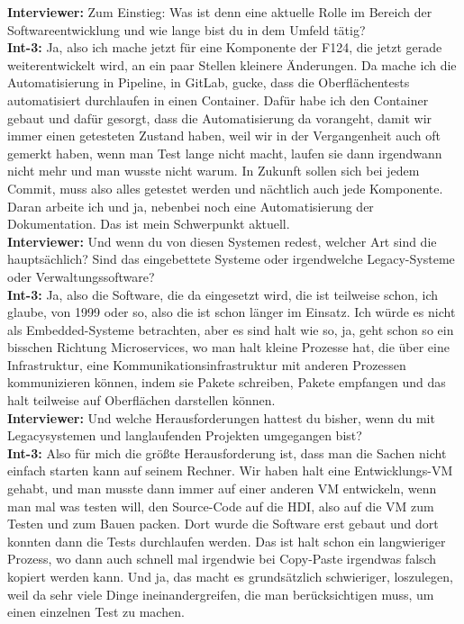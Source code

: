 \textbf{Interviewer:} Zum Einstieg: Was ist denn eine aktuelle Rolle im Bereich der Softwareentwicklung und wie lange bist du in dem Umfeld tätig? \\
\textbf{Int-3:} Ja, also ich mache jetzt für eine Komponente der F124, die jetzt gerade weiterentwickelt wird, an ein paar Stellen kleinere Änderungen. Da mache ich die Automatisierung in Pipeline, in GitLab, gucke, dass die Oberflächentests automatisiert durchlaufen in einen Container. Dafür habe ich den Container gebaut und dafür gesorgt, dass die Automatisierung da vorangeht, damit wir immer einen getesteten Zustand haben, weil wir in der Vergangenheit auch oft gemerkt haben, wenn man Test lange nicht macht, laufen sie dann irgendwann nicht mehr und man wusste nicht warum. In Zukunft sollen sich bei jedem Commit, muss also alles getestet werden und nächtlich auch jede Komponente. Daran arbeite ich und ja, nebenbei noch eine Automatisierung der Dokumentation. Das ist mein Schwerpunkt aktuell.\\
\textbf{Interviewer:} Und wenn du von diesen Systemen redest, welcher Art sind die hauptsächlich? Sind das eingebettete Systeme oder irgendwelche Legacy-Systeme oder Verwaltungssoftware?\\
\textbf{Int-3:} Ja, also die Software, die da eingesetzt wird, die ist teilweise schon, ich glaube, von 1999 oder so, also die ist schon länger im Einsatz. Ich würde es nicht als Embedded-Systeme betrachten, aber es sind halt wie so, ja, geht schon so ein bisschen Richtung Microservices, wo man halt kleine Prozesse hat, die über eine Infrastruktur, eine Kommunikationsinfrastruktur mit anderen Prozessen kommunizieren können, indem sie Pakete schreiben, Pakete empfangen und das halt teilweise auf Oberflächen darstellen können. \\
\textbf{Interviewer:} Und welche Herausforderungen hattest du bisher, wenn du mit Legacysystemen und langlaufenden Projekten umgegangen bist?\\
\textbf{Int-3:} Also für mich die größte Herausforderung ist, dass man die Sachen nicht einfach starten kann auf seinem Rechner. Wir haben halt eine Entwicklungs-VM gehabt, und man musste dann immer auf einer anderen VM entwickeln, wenn man mal was testen will, den Source-Code auf die HDI, also auf die VM zum Testen und zum Bauen packen. Dort wurde die Software erst gebaut und dort konnten dann die Tests durchlaufen werden. Das ist halt schon ein langwieriger Prozess, wo dann auch schnell mal irgendwie bei Copy-Paste irgendwas falsch kopiert werden kann. Und ja, das macht es grundsätzlich schwieriger, loszulegen, weil da sehr viele Dinge ineinandergreifen, die man berücksichtigen muss, um einen einzelnen Test zu machen. \\
